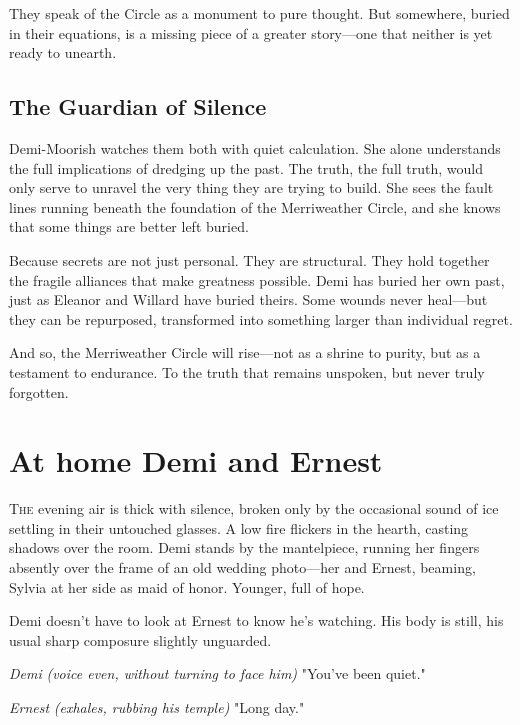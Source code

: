 They speak of the Circle as a monument to pure thought. But somewhere, buried in their equations, is a missing piece of a greater story—one that neither is yet ready to unearth.

\subsection*{The Guardian of Silence}

Demi-Moorish watches them both with quiet calculation. She alone understands the full implications of dredging up the past. The truth, the full truth, would only serve to unravel the very thing they are trying to build. She sees the fault lines running beneath the foundation of the Merriweather Circle, and she knows that some things are better left buried.

Because secrets are not just personal. They are structural. They hold together the fragile alliances that make greatness possible. Demi has buried her own past, just as Eleanor and Willard have buried theirs. Some wounds never heal—but they can be repurposed, transformed into something larger than individual regret.

And so, the Merriweather Circle will rise—not as a shrine to purity, but as a testament to endurance. To the truth that remains unspoken, but never truly forgotten.

\newpage

\section*{At home Demi and Ernest}

\lettrine{T}{he} evening air is thick with silence, broken only by the occasional sound of ice settling in their untouched glasses. A low fire flickers in the hearth, casting shadows over the room. Demi stands by the mantelpiece, running her fingers absently over the frame of an old wedding photo—her and Ernest, beaming, Sylvia at her side as maid of honor. Younger, full of hope.

Demi doesn’t have to look at Ernest to know he’s watching. His body is still, his usual sharp composure slightly unguarded.

\midskip

\textit{Demi} \textit{(voice even, without turning to face him)}  
"You’ve been quiet."

\midskip

\textit{Ernest} \textit{(exhales, rubbing his temple)}  
"Long day."

